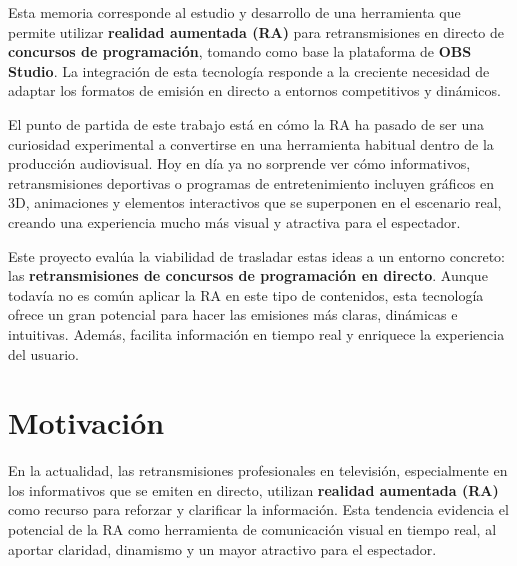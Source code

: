 

    Esta memoria corresponde al estudio y desarrollo de una herramienta que permite utilizar \textbf{realidad aumentada (RA)} para retransmisiones en directo de \textbf{concursos de programación}, tomando como base la plataforma de \textbf{OBS Studio}. La integración de esta tecnología responde a la creciente necesidad de adaptar los formatos de emisión en directo a entornos competitivos y dinámicos.
    
    El punto de partida de este trabajo está en cómo la RA ha pasado de ser una curiosidad experimental a convertirse en una herramienta habitual dentro de la producción audiovisual. Hoy en día ya no sorprende ver cómo informativos, retransmisiones deportivas o programas de entretenimiento incluyen gráficos en 3D, animaciones y elementos interactivos que se superponen en el escenario real, creando una experiencia mucho más visual y atractiva para el espectador.

Este proyecto evalúa la viabilidad de trasladar estas ideas a un entorno concreto: las \textbf{retransmisiones de concursos de programación en directo}. Aunque todavía no es común aplicar la RA en este tipo de contenidos, esta tecnología ofrece un gran potencial para hacer las emisiones más claras, dinámicas e intuitivas. Además, facilita información en tiempo real y enriquece la experiencia del usuario.
    
    \section{Motivación}
    
    En la actualidad, las retransmisiones profesionales en televisión, especialmente en los informativos que se emiten en directo, utilizan \textbf{realidad aumentada (RA)} como recurso para reforzar y clarificar la información. Esta tendencia evidencia el potencial de la RA como herramienta de comunicación visual en tiempo real, al aportar claridad, dinamismo y un mayor atractivo para el espectador.
    
